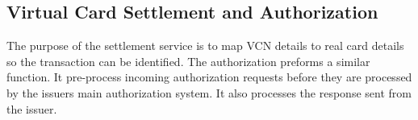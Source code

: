 \documentclass[a4paper, 11pt, titlepage]{article}
\begin{document}
\subsection{Virtual Card Settlement and Authorization} 
The purpose of the settlement service is to map VCN details to real card details so the transaction can be identified.
The authorization preforms a similar function. It pre-process incoming authorization requests before they are processed by the issuers main authorization system. It also processes the response sent from the issuer.
 
 
\cite{Orbiscom_Arch} 

 

 
 
 
\end{document}
